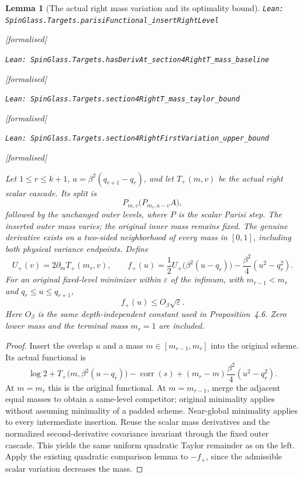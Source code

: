 \documentclass[11pt]{article}
\providecommand{\lean}[1]{\leavevmode\par\nopagebreak
  {\noindent\normalfont\footnotesize\raggedright\texttt{Lean: #1}\par}\nopagebreak}
\providecommand{\leanok}{\par\nopagebreak
  {\noindent\normalfont\footnotesize\textcolor{green!50!black}{[formalised]}\par}\nopagebreak}
\newtheorem{lemma}[theorem]{Lemma}
\begin{document}
\begin{lemma}[The actual right mass variation and its optimality bound]
\lean{SpinGlass.Targets.parisiFunctional\_insertRightLevel}\leanok
\lean{SpinGlass.Targets.hasDerivAt\_section4RightT\_mass\_baseline}\leanok
\lean{SpinGlass.Targets.section4RightT\_mass\_taylor\_bound}\leanok
\lean{SpinGlass.Targets.section4RightFirstVariation\_upper\_bound}\leanok
Let $1\le r\le k+1$, $a=\beta^2(q_{r+1}-q_r)$, and let $T_+(m,v)$
be the actual right scalar cascade. Its split is
\[
 P_{m,v}\bigl(P_{m_r,a-v}A\bigr),
\]
followed by the unchanged outer levels, where $P$ is the scalar Parisi step.
The inserted outer mass varies; the original inner mass remains fixed.
The genuine derivative exists on a two-sided neighborhood of every mass in
$[0,1]$, including both physical variance endpoints. Define
\[
 U_+(v)=2\partial_mT_+(m_r,v),\qquad
 f_+(u)=\frac12U_+\bigl(\beta^2(u-q_r)\bigr)
       -\frac{\beta^2}{4}(u^2-q_r^2).
\]
For an original fixed-level minimizer within $\varepsilon$ of the infimum,
with $m_{r-1}<m_r$ and $q_r\le u\le q_{r+1}$,
\[
 f_+(u)\le O_\beta\sqrt\varepsilon.
\]
Here $O_\beta$ is the same depth-independent constant used in Proposition~4.6.
Zero lower mass and the terminal mass $m_r=1$ are included.
\end{lemma}
\begin{proof}
Insert the overlap $u$ and a mass $m\in[m_{r-1},m_r]$ into the original
scheme. Its actual functional is
\[
 \log2+T_+\bigl(m,\beta^2(u-q_r)\bigr)
 -\operatorname{corr}(s)
 +(m_r-m)\frac{\beta^2}{4}(u^2-q_r^2).
\]
At $m=m_r$ this is the original functional. At $m=m_{r-1}$, merge the
adjacent equal masses to obtain a same-level competitor; original minimality
applies without assuming minimality of a padded scheme. Near-global
minimality applies to every intermediate insertion. Reuse the scalar mass
derivatives and the normalized second-derivative covariance invariant through
the fixed outer cascade. This yields the same uniform quadratic Taylor
remainder as on the left. Apply the existing quadratic comparison lemma to
$-f_+$, since the admissible scalar variation decreases the mass.
\end{proof}
\end{document}
